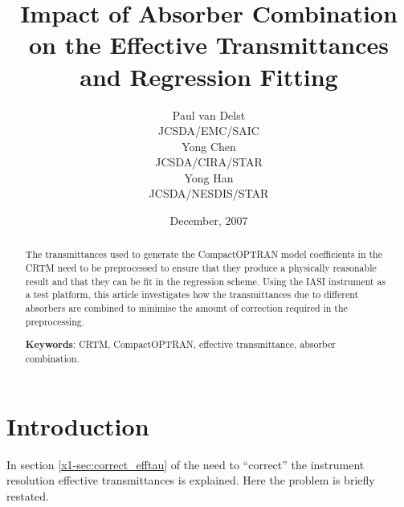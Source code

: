





\title{Impact of Absorber Combination on the Effective Transmittances and Regression Fitting}
\author{Paul van Delst\\JCSDA/EMC/SAIC\\[0.25in]
        Yong Chen\\JCSDA/CIRA/STAR\\[0.25in]
        Yong Han\\JCSDA/NESDIS/STAR}
\date{December, 2007}




\maketitle

\begin{abstract}
The transmittances used to generate the CompactOPTRAN model coefficients in the CRTM need to be preprocessed to ensure that they produce a physically reasonable result and that they can be fit in the regression scheme. Using the IASI instrument as a test platform, this article investigates how the transmittances due to different absorbers are combined to minimise the amount of correction required in the preprocessing.

\textbf{Keywords}: CRTM, CompactOPTRAN, effective transmittance, absorber combination.
\end{abstract}


\section{Introduction}
In section \ref{x1-sec:correct_efftau} of \cite{CRTM_IASI_Transmittance} the need to ``correct'' the instrument resolution effective transmittances is explained. Here the problem is briefly restated.

